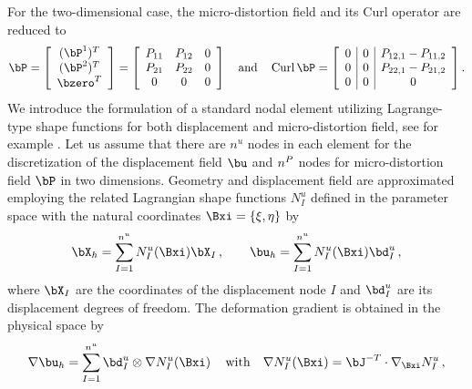 For the two-dimensional case, the micro-distortion field and its Curl operator are reduced to 
 \begin{equation}
\label{eq:t:2dCurlBdis}
\Bdis = \left[ \begin{array}{c}
(\Bdis^{1})^T \\
(\Bdis^{2})^T \\
\bzero^T 
\end{array}\right] = \left[\begin{array}{c c c }
 \dis_{11}  &  \dis_{12}   & 0\\   
 \dis_{21}  &  \dis_{22}   & 0\\
 0 & 0 & 0 
\end{array}\right] \quad \textrm{and} \quad 
\Curl \Bdis = 
\left[\begin{array}{c|c|c}
0	&   0  &  \dis_{12,1} - \dis_{11,2} \\
0   &   0  &  \dis_{22,1} - \dis_{21,2} \\
0 & 0 & 0
\end{array}\right].
 \end{equation}
\label{sec:fem} 
\label{sec:standardelements}
We introduce the formulation of a  standard nodal element utilizing Lagrange-type shape functions for both displacement and micro-distortion field, see for example \cite{Wri:2008:nfe}. Let us assume that there are $n^u$ nodes in each element for the discretization of the displacement field $\bu$ and $n^P$ nodes for micro-distortion field $\Bdis$ in two dimensions. Geometry and displacement field are approximated employing the related Lagrangian shape functions $N^u_I$ defined in the parameter space with the natural coordinates $\Bxi = \{ \xi, \eta\}$ by
\begin{equation}
\label{eq:t:approx_chi_u}
 \bX_h = \sum_{I=1}^{n^u} N^u_I(\Bxi)  \bX_I\,, \qquad \bu_h = \sum_{I=1}^{n^u} N^u_I(\Bxi)  \bd^u_I\,,
\end{equation}
where $\bX_I$  are the coordinates of the displacement node  $I$ and  $\bd^u_I$ are its displacement degrees of freedom. The deformation gradient is obtained in the physical space by 
\begin{equation}
\nabla \bu_h = \sum_{I=1}^{n^u} \bd^u_I \otimes \nabla N^u_I(\Bxi)\, \quad \textrm{with} \quad 
\nabla {N^u_I(\Bxi)} = \bJ^{-T} \cdot \nabla_\Bxi N^u_{I}\,,
\end{equation}
